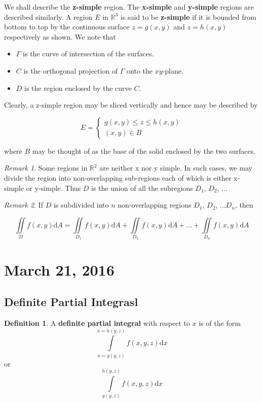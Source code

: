 \documentclass[11pt]{article}
\theoremstyle{plain} %
\theoremstyle{definition}
\newtheorem*{definition}{Definition} %
\theoremstyle{example}
\theoremstyle{remark}
\newtheorem*{remark}{Remark}
\begin{document}
We shall describe the \textbf{z-simple} region. The \textbf{x-simple} and \textbf{y-simple} regions are described similarly. A region $E$ in $\mathbb R^3$ is said to be \textbf{z-simple} if it is bounded from bottom to top by the continuous surface $z=g(x, y)$ and $z= h(x,y)$ respectively as shown. We note that 

\begin{itemize}
	\item $\Gamma$ is the curve of intersection of the surfaces.
	\item $C$ is the orthogonal projection of $\Gamma$ onto the $xy$-plane.
	\item $D$ is the region enclosed by the curve $C$.
\end{itemize}

Clearly, a z-simple region may be sliced vertically and hence may be described by 

$$E = \begin{cases}
		g(x, y) \leq z \leq h(x, y) \\
		(x, y) \in B
	\end{cases}$$

where $B$ may be thought of as the base of the solid enclosed by the two surfaces. 

\begin{remark}
Some regions in $\mathbb R^2$ are neither x nor y simple. In such cases, we may divide the region into non-overlapping sub-regions each of which is either x-simple or y-simple. Thus $D$ is the union of all the subregions $D_1$, $D_2$, ...
\end{remark}

\begin{remark}
If $D$ is subdivided into $n$ non-overlapping regions $D_1$, $D_2$, ...$D_n$, then

$$\iint \limits_D f(x,y) \mathrm d A = \iint \limits_{D_1} f(x,y) \mathrm d A + \iint \limits_{D_2} f(x,y) \mathrm d A+ ... +\iint \limits_{D_n} f(x,y) \mathrm d A$$
\end{remark}

\section{March 21, 2016}
\subsection{Definite Partial Integrasl}

\begin{definition}
A \textbf{definite partial integral} with respect to $x$ is of the form $$\int\limits_{x=g(y,z)}^{x=h(y,z)}f(x, y, z) \mathrm d x$$
or
$$\int\limits_{g(y,z)}^{h(y,z)}f(x, y, z) \mathrm d x$$

\end{definition}
\end{document}
